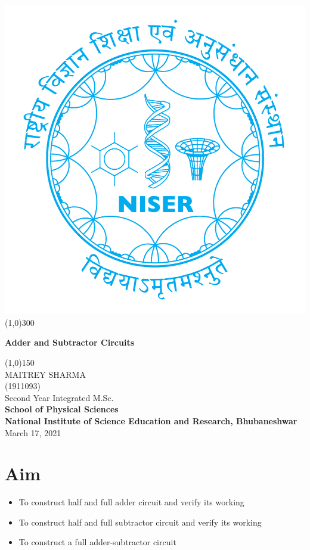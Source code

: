 \begin{titlepage}
\begin{center}
\includegraphics[scale=0.15]{Documents/niser.png}
\line(1,0){300}\\
[2mm]
\begin{large}
\textbf{\huge Adder and Subtractor Circuits}\\ 
\end{large}
\line(1,0){150}\\
[5cm]
\large MAITREY SHARMA\\
\small (1911093)\\
[4.5cm]
Second Year Integrated M.Sc.\\
\textbf{School of Physical Sciences}\\
\textbf{National Institute of Science Education and Research, Bhubaneshwar}\\
\small March 17, 2021
\end{center} 
\end{titlepage}
\newpage
\section{Aim}
\begin{itemize}
    \item To construct half and full adder circuit and verify its working
    \item To construct half and full subtractor circuit and verify its working
    \item To construct a full adder-subtractor circuit
\end{itemize}
